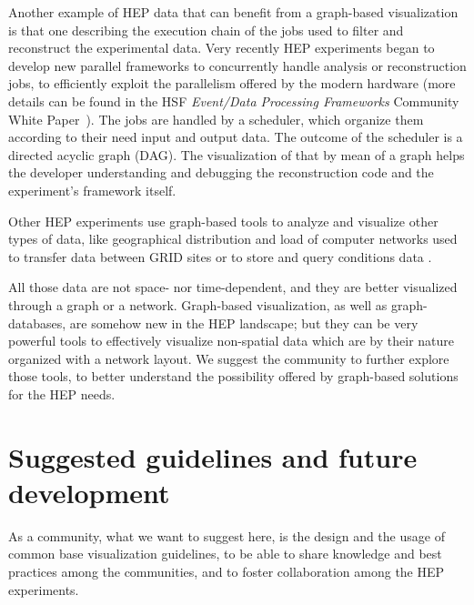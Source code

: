 \documentclass[12pt,a4paper]{article}
\begin{document}
Another example of HEP data that can benefit from a graph-based visualization is that one describing the execution chain of the jobs
used to filter and reconstruct the experimental data. Very recently HEP experiments began to develop new parallel frameworks
to concurrently handle analysis or reconstruction jobs, to efficiently exploit the parallelism offered by the modern hardware (more details can be found in the HSF \textit{Event/Data Processing Frameworks} Community White Paper~\cite{HSF-CWP-2017-08}).
The jobs are handled by a scheduler, which organize them according to their need input and output data. The outcome of the scheduler
is a directed acyclic graph (DAG). The visualization of that by mean of a graph helps the developer understanding and debugging the
reconstruction code and the experiment’s framework itself.

Other HEP experiments use graph-based tools to analyze and visualize other types of data, like geographical distribution and load of computer networks used to transfer data between GRID sites \cite{???} %
 or to store and query conditions data \cite{Clemencic:2012cw}.


All those data are not space- nor time-dependent, and they are better visualized through a graph or a network. Graph-based visualization,
as well as graph-databases, are somehow new in the HEP landscape; but they can be very powerful tools to effectively visualize
non-spatial data which are by their nature organized with a network layout. We suggest the community to further explore those tools, to better understand the possibility offered by graph-based solutions for the HEP needs.





\hypertarget{suggested-guidelines}{%
\section{Suggested guidelines and future development}\label{suggested-guidelines}}

As a community, what we want to suggest here, is the design and the usage of common base visualization guidelines, to be able to share
knowledge and best practices among the communities, and to foster collaboration among the HEP experiments.
\end{document}
